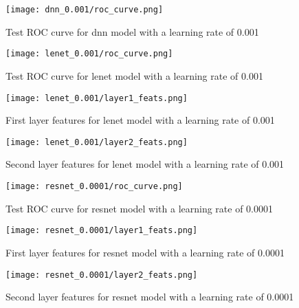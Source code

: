\documentclass{article}
\begin{document}
\begin{figure}[h]
    \centering
    \texttt{[image: dnn\_0.001/roc\_curve.png]}
    \caption{Test ROC curve for dnn model with a learning rate of 0.001}
    \label{fig:dnn_0.001_roc}
\end{figure}

\begin{figure}[h]
    \centering
    \texttt{[image: lenet\_0.001/roc\_curve.png]}
    \caption{Test ROC curve for lenet model with a learning rate of 0.001}
    \label{fig:lenet_0.001_roc}
\end{figure}

\begin{figure}[h]
    \centering
    \texttt{[image: lenet\_0.001/layer1\_feats.png]}
    \caption{First layer features for lenet model with a learning rate of 0.001}
    \label{fig:lenet_0.001_layer1_feats}
\end{figure}

\begin{figure}[h]
    \centering
    \texttt{[image: lenet\_0.001/layer2\_feats.png]}
    \caption{Second layer features for lenet model with a learning rate of 0.001}
    \label{fig:lenet_0.001_layer2_feats}
\end{figure}

\begin{figure}[h]
    \centering
    \texttt{[image: resnet\_0.0001/roc\_curve.png]}
    \caption{Test ROC curve for resnet model with a learning rate of 0.0001}
    \label{fig:resnet_0.0001_roc}
\end{figure}

\begin{figure}[h]
    \centering
    \texttt{[image: resnet\_0.0001/layer1\_feats.png]}
    \caption{First layer features for resnet model with a learning rate of 0.0001}
    \label{fig:resnet_0.0001_layer1_feats}
\end{figure}

\begin{figure}[h]
    \centering
    \texttt{[image: resnet\_0.0001/layer2\_feats.png]}
    \caption{Second layer features for resnet model with a learning rate of 0.0001}
    \label{fig:resnet_0.0001_layer2_feats}
\end{figure}
\end{document}
